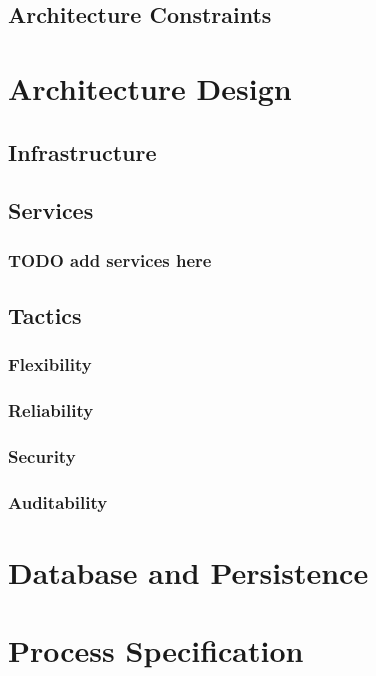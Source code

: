 \documentclass{article}
\begin{document}
\subsection{Architecture Constraints}

\section{Architecture Design}

\subsection{Infrastructure}

\subsection{Services}

\subsubsection{TODO add services here}

\subsection{Tactics}

\subsubsection{Flexibility}

\subsubsection{Reliability}

\subsubsection{Security}

\subsubsection{Auditability}

\section{Database and Persistence}

\section{Process Specification}
\end{document}
